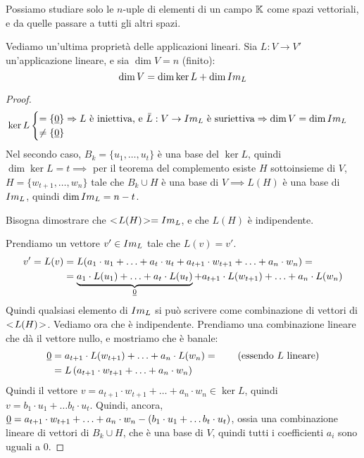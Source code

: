 Possiamo studiare solo le $n$-uple di elementi di un campo $\mathbb{K}$ come spazi vettoriali, e da quelle passare a tutti gli altri spazi.

Vediamo un'ultima propriet\`a delle applicazioni lineari. Sia $L : V \to V'$ un'applicazione lineare, e sia $\dim V = n$ (finito):
\[
\dim V = \dim \ker L + \dim Im_{L}
\]
\begin{proof}
\[
\ker L 
\begin{cases}
= \{ \underline{0} \} \Rightarrow L \text{ \`e iniettiva, e } \bar L : V \to Im_{L} \text{ \`e suriettiva} \Rightarrow \dim V = \dim Im_{L} \\
\neq \{ \underline{0} \}
\end{cases}
\]
Nel secondo caso, $B_k = \{ u_{1}, \ldots, u_{t} \}$ \`e una base del $\ker L$, quindi $\dim \ker L = t \implies$ per il teorema del complemento esiste $H$ sottoinsieme di $V$, $H = \{ {w}_{t+1}, \ldots, {w}_{n} \}$ tale che $B_k \cup H$ \`e una base di $V \implies L(H)$ \`e una base di $Im_{L}$, quindi $\dim Im_{L} = n - t$.

Bisogna dimostrare che $<\!{L(H)}\!> = Im_{L}$, e che $L(H)$ \`e indipendente.

Prendiamo un vettore $v' \in Im_{L} $ tale che $ L(v) = v'$. 
\begin{align*}
v' = L(v) &= L(a_1 \cdot u_1 + \ldots + a_t \cdot u_t + a_{t+1} \cdot w_{t+1} + \ldots + a_{n} \cdot w_{n}) = \\
&= \underbrace{a_1 \cdot L(u_1) + \ldots + a_t \cdot L(u_t)}_{\underline{0}} + a_{t+1} \cdot L(w_{t+1}) + \ldots + a_n \cdot L(w_n)
\end{align*}
Quindi qualsiasi elemento di $Im_{L}$ si pu\`o scrivere come combinazione di vettori di $<\!{L(H)}\!>$. Vediamo ora che \`e indipendente. Prendiamo una combinazione lineare che d\`a il vettore nullo, e mostriamo che \`e banale:
\begin{align*}
\underline{0} &= a_{t+1} \cdot L(w_{t+1}) + \ldots + a_n \cdot L(w_n) = \tag{essendo $L$ lineare} \\ 
&= L \left( a_{t+1} \cdot w_{t+1} + \ldots + a_n \cdot w_n \right)
\end{align*}
Quindi il vettore $v = a_{t+1} \cdot w_{t+1} + \ldots + a_n \cdot w_n \in \ker L$, quindi $v = b_1 \cdot u_1 + \dots b_t \cdot u_t$. Quindi, ancora, $\underline{0} = a_{t+1} \cdot w_{t+1} + \ldots + a_n \cdot w_n - (b_1 \cdot u_1 + \ldots b_t \cdot u_t)$, ossia una combinazione lineare di vettori di $B_k \cup H$, che \`e una base di $V$, quindi tutti i coefficienti $a_i$ sono uguali a 0.
\end{proof}

